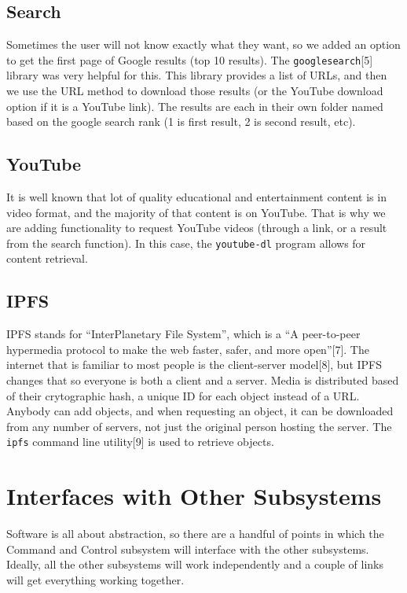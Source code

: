 \documentclass{article}
\begin{document}
\subsection{Search}

Sometimes the user will not know exactly what they want, so we added
an option to get the first page of Google results (top 10
results). The \texttt{googlesearch}[5] library was very helpful for
this. This library provides a list of URLs, and then we use the URL
method to download those results (or the YouTube download option if it
is a YouTube link). The results are each in their own folder named
based on the google search rank (1 is first result, 2 is second
result, etc). 

\subsection{YouTube}

It is well known that lot of quality educational and entertainment
content is in video format, and the majority of that content is on
YouTube. That is why we are adding functionality to request YouTube
videos (through a link, or a result from the search function). In this
case, the \texttt{youtube-dl} program allows for content retrieval.

\subsection{IPFS}
IPFS stands for ``InterPlanetary File System'', which is a ``A
peer-to-peer hypermedia protocol to make the web faster, safer, and
more open''[7]. The internet that is familiar to most people is the
client-server model[8], but IPFS changes that so everyone is both a
client and a server. Media is distributed based of their crytographic
hash, a unique ID for each object instead of a URL. Anybody can add
objects, and when requesting an object, it can be downloaded from any
number of servers, not just the original person hosting the
server. The \texttt{ipfs} command line utility[9] is used to retrieve
objects.

\section{Interfaces with Other Subsystems}

Software is all about abstraction, so there are a handful of points in
which the Command and Control subsystem will interface with the other
subsystems. Ideally, all the other subsystems will work independently
and a couple of links will get everything working together.
\end{document}
